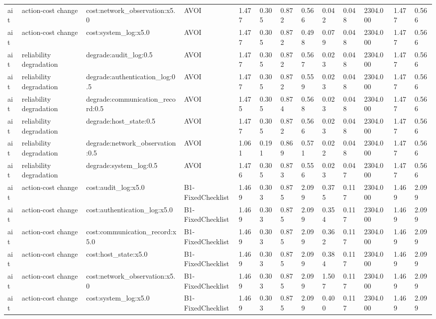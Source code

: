 \begin{table}[!ht]
{\begin{tabular}{lllllllllllll}
ait & action-cost change & cost:network\_observation:x5.0 & AVOI & 1.477 & 0.305 & 0.872 & 0.566 & 0.042 & 0.048 & 2304.000 & 1.477 & 0.566 \\
ait & action-cost change & cost:system\_log:x5.0 & AVOI & 1.477 & 0.305 & 0.872 & 0.498 & 0.079 & 0.048 & 2304.000 & 1.477 & 0.566 \\
ait & reliability degradation & degrade:audit\_log:0.5 & AVOI & 1.477 & 0.305 & 0.872 & 0.567 & 0.023 & 0.048 & 2304.000 & 1.477 & 0.566 \\
ait & reliability degradation & degrade:authentication\_log:0.5 & AVOI & 1.477 & 0.305 & 0.872 & 0.559 & 0.023 & 0.048 & 2304.000 & 1.477 & 0.566 \\
ait & reliability degradation & degrade:communication\_record:0.5 & AVOI & 1.475 & 0.305 & 0.874 & 0.568 & 0.023 & 0.048 & 2304.000 & 1.477 & 0.566 \\
ait & reliability degradation & degrade:host\_state:0.5 & AVOI & 1.477 & 0.305 & 0.872 & 0.566 & 0.023 & 0.048 & 2304.000 & 1.477 & 0.566 \\
ait & reliability degradation & degrade:network\_observation:0.5 & AVOI & 1.061 & 0.191 & 0.869 & 0.571 & 0.022 & 0.048 & 2304.000 & 1.477 & 0.566 \\
ait & reliability degradation & degrade:system\_log:0.5 & AVOI & 1.476 & 0.305 & 0.873 & 0.556 & 0.023 & 0.047 & 2304.000 & 1.477 & 0.566 \\
ait & action-cost change & cost:audit\_log:x5.0 & B1-FixedChecklist & 1.469 & 0.303 & 0.875 & 2.099 & 0.375 & 0.117 & 2304.000 & 1.469 & 2.099 \\
ait & action-cost change & cost:authentication\_log:x5.0 & B1-FixedChecklist & 1.469 & 0.303 & 0.875 & 2.099 & 0.354 & 0.117 & 2304.000 & 1.469 & 2.099 \\
ait & action-cost change & cost:communication\_record:x5.0 & B1-FixedChecklist & 1.469 & 0.303 & 0.875 & 2.099 & 0.362 & 0.117 & 2304.000 & 1.469 & 2.099 \\
ait & action-cost change & cost:host\_state:x5.0 & B1-FixedChecklist & 1.469 & 0.303 & 0.875 & 2.099 & 0.384 & 0.117 & 2304.000 & 1.469 & 2.099 \\
ait & action-cost change & cost:network\_observation:x5.0 & B1-FixedChecklist & 1.469 & 0.303 & 0.875 & 2.099 & 1.507 & 0.117 & 2304.000 & 1.469 & 2.099 \\
ait & action-cost change & cost:system\_log:x5.0 & B1-FixedChecklist & 1.469 & 0.303 & 0.875 & 2.099 & 0.400 & 0.117 & 2304.000 & 1.469 & 2.099 \\

\end{tabular}}
\end{table}
